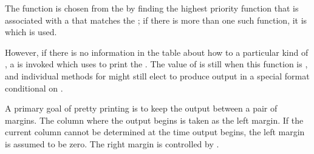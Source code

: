 The function is chosen from the 
by finding the highest priority function 
that is associated with a  that matches the ;
if there is more than one such function, 
it is  which is used.

However, if there is no 
information in the table
about how to  a particular kind of , 
a  is invoked which uses  to print the .
The value of  is still  
when this function is ,
and individual methods for  might still elect to
produce output in a special format conditional on .

\endsubsubsection%


A primary goal of pretty printing is to keep the output between a pair of
margins. 
The column where the output begins is taken as the left margin.
If the current column cannot be determined at the time output begins,
the left margin is assumed to be zero.
The right margin is controlled by .

\endsubsubsection%

\endsubSection%

